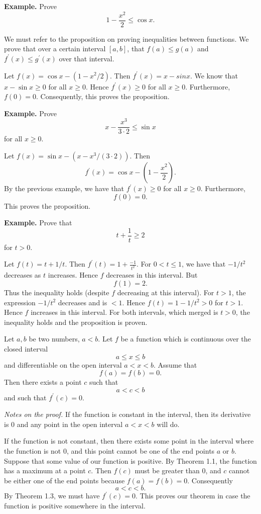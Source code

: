 \textbf{Example.} Prove
\[1 - \frac{x^2}{2} \le \cos x.\]

We must refer to the proposition on proving inequalities between functions. We prove that over a certain interval $[a,b]$, that $f(a) \le g(a)$ and $f^\prime(x) \le g^\prime(x)$ over that interval.

Let $f(x) = \cos x - (1 - x^2/2)$. Then $f^\prime(x) = x - sin x$. We know that $x - \sin x \ge 0$ for all $x \ge 0$. Hence $f^\prime(x) \ge 0$ for all $x \ge 0$. Furthermore, $f(0) = 0$. Consequently, this proves the proposition.

\textbf{Example.} Prove
\[x - \frac{x^3}{3 \cdot 2} \le \sin x\]
for all $x \ge 0$.

Let $f(x) = \sin x - (x - x^3/(3 \cdot 2))$. Then
\[f^\prime(x) = \cos x - (1 - \frac{x^2}{2}).\]
By the previous example, we have that $f^\prime(x) \ge 0$ for all $x \ge 0$. Furthermore,
\[f(0) = 0.\]
This proves the proposition.

\textbf{Example.} Prove that
\[t + \frac{1}{t} \ge 2\]
for $t > 0$.

Let $f(t) = t + 1/t$. Then $f^\prime(t) = 1 + \frac{-1}{t^2}$. For $0 < t \le 1$, we have that $-1/t^2$ decreases as $t$ increases. Hence $f$ decreases in this interval. But
\[f(1) = 2.\]
Thus the inequality holds (despite $f$ decreasing at this interval). For $t > 1$, the expression $-1/t^2$ decreases and is $< 1$. Hence $f(t) = 1 - 1/t^2 > 0$ for $t > 1$. Hence $f$ increases in this interval. For both intervals, which merged is $t > 0$, the inequality holds and the proposition is proven.

\begin{theorem}
  Let $a, b$ be two numbers, $a < b$. Let $f$ be a function which is continuous over the closed interval
  \[a \le x \le b\]
  and differentiable on the open interval $a < x < b$. Assume that
  \[f(a) = f(b) = 0.\]
  Then there exists a point $c$ such that
  \[a < c < b\]
  and such that $f^\prime(c) = 0$.
\end{theorem}

\textit{Notes on the proof.}
If the function is constant in the interval, then its derivative is $0$ and any point in the open interval $a < x < b$ will do.

If the function is not constant, then there exists some point in the interval where the function is not $0$, and this point cannot be one of the end points $a$ or $b$. Suppose that some value of our function is positive. By Theorem 1.1, the function has a maximum at a point $c$. Then $f(c)$ must be greater than $0$, and $c$ cannot be either one of the end points because $f(a) = f(b) = 0$. Consequently
\[a < c < b.\]
By Theorem 1.3, we must have $f^\prime(c) = 0$. This proves our theorem in case the function is positive somewhere in the interval.

